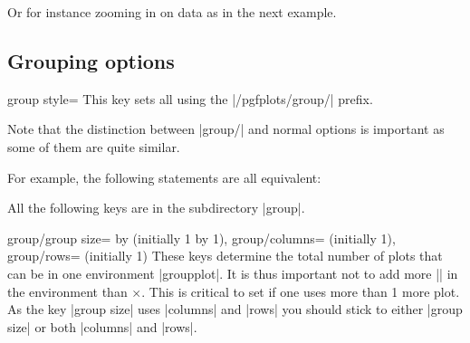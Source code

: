 {\begin{command}{\nextgroupplot{} }
Or for instance zooming in on data as in the next example.
\begin{codeexample}[]
\end{codeexample}
\end{command}


\subsection{Grouping options}
\label{sec:pgfplots:group:options}


\begin{pgfplotskey}{group style=}
  This key sets all  using the |/pgfplots/group/| prefix.
  
  Note that the distinction between |group/| and normal options is important as some of them are quite similar.

   For example, the following statements are all equivalent:
\begin{codeexample}
\pgfplotsset{group/a=2,group/b=3}
\pgfplotsset{group/.cd,a=2,b=3}
\end{codeexample}
\end{pgfplotskey}
All the following keys are in the subdirectory |group|.

\begin{pgfplotskeylist}{group/group size= by  (initially 1 by 1),
      group/columns= (initially 1),
      group/rows= (initially 1)}
  These keys determine the total number of plots that can be in one environment |groupplot|. It is thus important not to add more
  |\nextgroupplot| in the environment than $\times$. This is critical to set if one uses more than 1 more plot. As
  the key |group size| uses |columns| and |rows| you should stick to either |group size| or both |columns| and |rows|.
\end{pgfplotskeylist}

}
